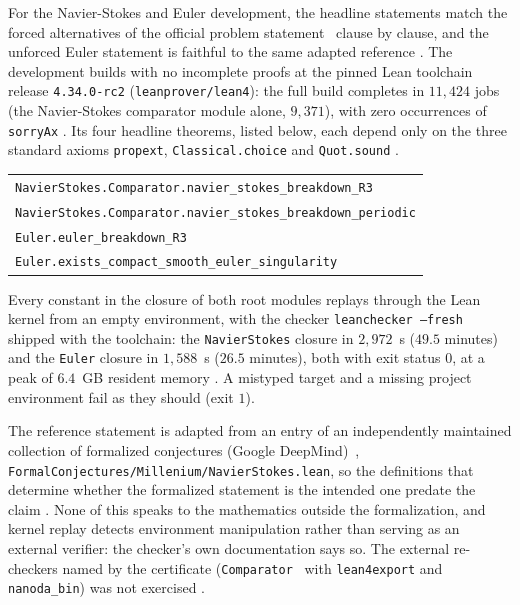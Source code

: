 \documentclass[11pt]{article}
\theoremstyle{remark}
\newcommand{\ev}[1]{\hspace{0.2em}{\small\textsf{[#1]}}}
\newcommand{\fp}[1]{\nolinkurl{#1}}
\begin{document}
For the Navier-Stokes and Euler development, the headline statements match the forced alternatives of the
official problem statement~\cite{fefferman} clause by clause, and the unforced Euler statement is
faithful to the same adapted reference \ev{V}. The development builds with no incomplete proofs at the pinned
Lean toolchain release \fp{4.34.0-rc2} (\fp{leanprover/lean4}): the full build completes in $11{,}424$ jobs (the
Navier-Stokes comparator module alone, $9{,}371$), with zero occurrences of \fp{sorryAx} \ev{MV}. Its
four headline theorems, listed below, each depend only on the three standard axioms
\fp{propext}, \fp{Classical.choice} and \fp{Quot.sound} \ev{MV}.
\begin{center}\footnotesize
\begin{tabular}{l}
\fp{NavierStokes.Comparator.navier_stokes_breakdown_R3}\\
\fp{NavierStokes.Comparator.navier_stokes_breakdown_periodic}\\
\fp{Euler.euler_breakdown_R3}\\
\fp{Euler.exists_compact_smooth_euler_singularity}
\end{tabular}
\end{center}
Every constant in the closure of both root modules replays through the
Lean kernel from an empty environment, with the checker \texttt{leanchecker --fresh} shipped with the
toolchain: the \fp{NavierStokes} closure in $2{,}972$~s ($49.5$ minutes) and the \fp{Euler}
closure in $1{,}588$~s ($26.5$ minutes), both with exit status $0$, at a peak of $6.4$~GB resident
memory \ev{MV}. A mistyped target and a missing project environment fail as they should (exit $1$).

\begin{sloppy}
The reference statement is adapted from an entry of an independently maintained collection of
formalized conjectures (Google DeepMind)~\cite{formalconj}, \fp{FormalConjectures/Millenium/NavierStokes.lean}, so the
definitions that determine whether the formalized statement is the intended one predate the claim
\ev{V}. None of this speaks to the mathematics outside the formalization, and kernel replay
detects environment manipulation rather than serving as an external verifier: the checker's own
documentation says so. The external re-checkers named by the certificate (\fp{Comparator}~\cite{comparator} with
\fp{lean4export} and \fp{nanoda_bin}) was not exercised \ev{U}.
\end{sloppy}
\end{document}
